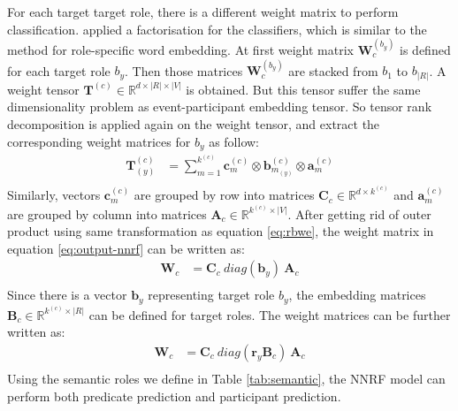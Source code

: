 \documentclass[a4paper]{article}
\begin{document}
For each target target role, there is a different weight matrix to perform classification. \citet{tilk2016event} applied a factorisation for the classifiers, which is similar to the method for role-specific word embedding. At first weight matrix $\mathbf{W}_c^{(b_y)}$ is defined for each target role $b_y$. Then those matrices $\mathbf{W}_c^{(b_y)}$ are stacked from $b_1$ to $b_{|R|}$. A weight tensor $\mathbf{T}^{(c)} \in \mathbb{R}^{d \times |R| \times |V|}$ is obtained. But this tensor suffer the same dimensionality problem as event-participant embedding tensor. So tensor rank decomposition is applied again on the weight tensor, and extract the corresponding weight matrices for $b_y$ as follow: 
\begin{equation} \label{eq:trd-cls}
\begin{aligned}
    \mathbf{T}_{(y)}^{(c)}
        &= \sum_{m=1}^{k^{(c)}} \mathbf{c}_{m}^{(c)} \otimes \mathbf{b}_{m_{(y)}}^{(c)} \otimes \mathbf{a}_m^{(c)} \\
\end{aligned}
\end{equation}
Similarly, vectors $\mathbf{c}_{m}^{(c)}$ are grouped by row into matrices $\mathbf{C}_c \in \mathbb{R}^{d \times k^{(c)}}$ and $\mathbf{a}_m^{(c)}$ are grouped by column into matrices $\mathbf{A}_c \in \mathbb{R}^{k^{(c)} \times |V|}$. After getting rid of outer product using same transformation as equation \eqref{eq:rbwe}, the weight matrix in equation \eqref{eq:output-nnrf}  can be written as:
\begin{equation} \label{eq:cls}
\begin{aligned}
    \mathbf{W}_c
        &= \mathbf{C}_c \ diag(\mathbf{b}_y) \ \mathbf{A}_c \\
\end{aligned}
\end{equation}
Since there is a vector $\mathbf{b}_y$ representing target role $b_y$, the embedding matrices $\mathbf{B}_c \in \mathbb{R}^{k^{(c)} \times |R|}$ can be defined for target roles. The weight matrices can be further written as:
\begin{equation} \label{eq:cls-temb}
\begin{aligned}
    \mathbf{W}_c
        &= \mathbf{C}_c \ diag(\mathbf{r}_y \mathbf{B}_c) \ \mathbf{A}_c \\
\end{aligned}
\end{equation}
Using the semantic roles we define in Table \ref{tab:semantic}, the NNRF model can perform both predicate prediction and participant prediction. 
\end{document}
